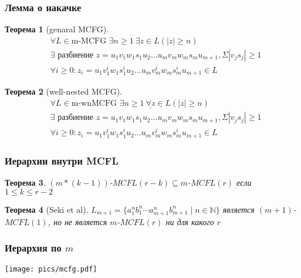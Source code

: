 \documentclass{beamer}
\newtheorem{rutheorem}{Теорема}
\begin{document}
\begin{frame}[fragile]
  
  \frametitle{Лемма о накачке}
  \begin{rutheorem}[genaral MCFG]
    \begin{align*}
    &\forall L \in \text{m-MCFG } \exists n \geq 1 \ \underline{\boldsymbol{\exists} z} \in L (|z| \geq n)  \\
    &\exists \text{ разбиение } z=u_1 v_1 w_1 s_1 u_2 \ldots u_m v_m w_m s_m u_{m+1}, \Sigma|v_js_j| \geq 1 \\
    &\forall i \geq 0: z_i = u_1 v_1^i w_1 s_1^i u_2 \ldots u_m v_m^i w_m s_m^i u_{m+1} \in L
    \end{align*}
  \end{rutheorem}
\pause
  \begin{rutheorem}[well-nested MCFG]
    \begin{align*}
    &\forall L \in \text{m-wnMCFG } \exists n \geq 1 \ \underline{\boldsymbol{\forall} z} \in L (|z| \geq n)  \\
    &\exists \text{ разбиение } z=u_1 v_1 w_1 s_1 u_2 \ldots u_m v_m w_m s_m u_{m+1}, \Sigma|v_js_j| \geq 1 \\
    &\forall i \geq 0: z_i = u_1 v_1^i w_1 s_1^i u_2 \ldots u_m v_m^i w_m s_m^i u_{m+1} \in L
    \end{align*}
  \end{rutheorem}
\end{frame}

\begin{frame}[fragile]
  
  \frametitle{Иерархии внутри MCFL}
  \begin{rutheorem}
  $(m*(k-1))$-$MCFL(r-k) \subseteq m$-$MCFL(r) $ если $1 \leq k \leq r - 2$ 
  \end{rutheorem}
  \pause
  \begin{rutheorem}[Seki et al]
  $L_{m+1} = \{a_1^nb_1^n\cdots a_{m+1}^n b_{m+1}^n \mid n\in \mathbb{N}\}$ является $(m+1)$-$MCFL(1)$, но не является $m$-$MCFL(r)$ ни для какого $r$ 
  \end{rutheorem}
  

\end{frame}


\begin{frame}[fragile]
  
  \frametitle{Иерархия по $m$}
  
\texttt{[image: pics/mcfg.pdf]}
\end{frame}
\end{document}
